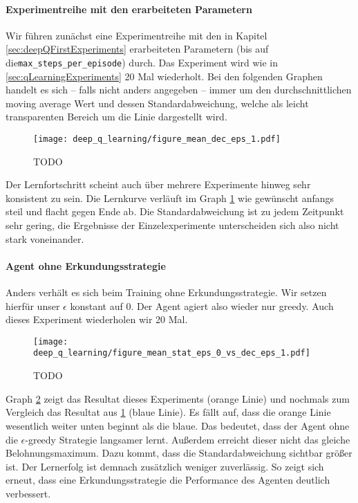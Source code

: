 \paragraph{Experimentreihe mit den erarbeiteten Parametern}
Wir führen zunächst eine Experimentreihe mit den in Kapitel \ref{sec:deepQFirstExperiments} erarbeiteten Parametern (bis auf die\linebreak\texttt{max_steps_per_episode}) durch. Das Experiment wird wie in \ref{sec:qLearningExperiments} 20 Mal wiederholt. Bei den folgenden Graphen handelt es sich -- falls nicht anders angegeben -- immer um den durchschnittlichen moving average Wert und dessen Standardabweichung, welche als leicht transparenten Bereich um die Linie dargestellt wird.
\begin{figure}[H]
    \centering
    \texttt{[image: deep\_q\_learning/figure\_mean\_dec\_eps\_1.pdf]}
    \caption{TODO} \label{img:graphDeepQMeanDecEps1}
\end{figure}
Der Lernfortschritt scheint auch über mehrere Experimente hinweg sehr konsistent zu sein. Die Lernkurve verläuft im Graph \ref{img:graphDeepQMeanDecEps1} wie gewünscht anfangs steil und flacht gegen Ende ab. Die Standardabweichung ist zu jedem Zeitpunkt sehr gering, die Ergebnisse der Einzelexperimente unterscheiden sich also nicht stark voneinander. 

\paragraph{Agent ohne Erkundungsstrategie}
Anders verhält es sich beim Training ohne Erkundungsstrategie. Wir setzen hierfür unser $ \epsilon $ konstant auf 0. Der Agent agiert also wieder nur greedy. Auch dieses Experiment wiederholen wir 20 Mal.
\begin{figure}[H]
    \centering
    \texttt{[image: deep\_q\_learning/figure\_mean\_stat\_eps\_0\_vs\_dec\_eps\_1.pdf]}
    \caption{TODO} \label{img:graphDeepQMeanStatEps0VsDecEps1}
\end{figure}
Graph \ref{img:graphDeepQMeanStatEps0VsDecEps1} zeigt das Resultat dieses Experiments (orange Linie) und nochmals zum Vergleich das Resultat aus \ref{img:graphDeepQMeanDecEps1} (blaue Linie). Es fällt auf, dass die orange Linie wesentlich weiter unten beginnt als die blaue. Das bedeutet, dass der Agent ohne die $ \epsilon $-greedy Strategie langsamer lernt. Außerdem erreicht dieser nicht das gleiche Belohnungsmaximum. Dazu kommt, dass die Standardabweichung sichtbar größer ist. Der Lernerfolg ist demnach zusätzlich weniger zuverlässig. So zeigt sich erneut, dass eine Erkundungsstrategie die Performance des Agenten deutlich verbessert.

